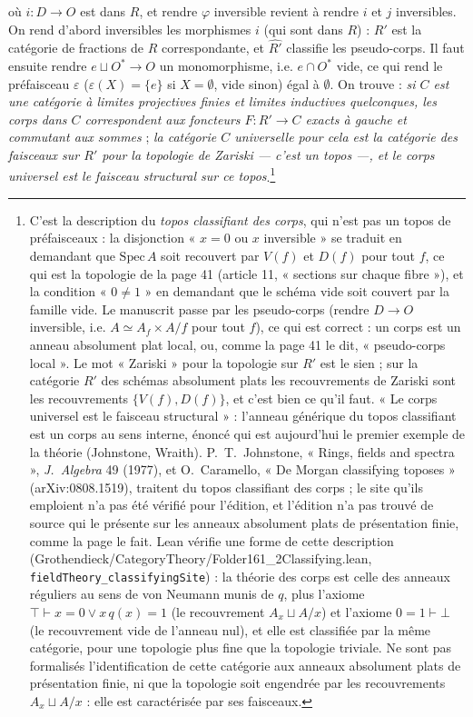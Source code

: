 \documentclass[11pt,a4paper]{article}
\begin{document}
où $i : D \to O$ est dans $R$, et rendre $\varphi$ inversible revient à
rendre $i$ et $j$ inversibles. On rend d'abord inversibles les morphismes
$i$ (qui sont dans $R$) : $R'$ est la catégorie de fractions de $R$
correspondante, et $\widehat{R'}$ classifie les pseudo-corps. Il faut
ensuite rendre $e \sqcup O^{*} \to O$ un monomorphisme, i.e. $e \cap O^{*}$
vide, ce qui rend le préfaisceau $\varepsilon$ ($\varepsilon(X) = \{e\}$ si
$X = \emptyset$, vide sinon) égal à $\emptyset$. On trouve : \emph{si $C$
est une catégorie à limites projectives finies et limites inductives
quelconques, les corps dans $C$ correspondent aux foncteurs $F : R' \to C$
exacts à gauche et commutant aux sommes} ; \emph{la catégorie $C$
universelle pour cela est la catégorie des faisceaux sur $R'$ pour la
topologie de Zariski — c'est un topos —, et le corps universel est le
faisceau structural sur ce topos}.\footnote{C'est la description
du \emph{topos classifiant des corps}, qui n'est pas un topos de
préfaisceaux : la disjonction « $x = 0$ ou $x$ inversible » se traduit en
demandant que $\mathrm{Spec}\,A$ soit recouvert par $V(f)$ et $D(f)$ pour
tout $f$, ce qui est la topologie de la page 41 (article 11, « sections
sur chaque fibre »), et la condition « $0 \neq 1$ » en demandant que le
schéma vide soit couvert par la famille vide. Le manuscrit passe par les
pseudo-corps (rendre $D \to O$ inversible, i.e. $A \simeq A_{f} \times
A/f$ pour tout $f$), ce qui est correct : un corps est un anneau
absolument plat local, ou, comme la page 41 le dit, « pseudo-corps
local ». Le mot « Zariski » pour la topologie sur $R'$ est le sien ; sur
la catégorie $R'$ des schémas absolument plats les recouvrements de
Zariski sont les recouvrements $\{V(f), D(f)\}$, et c'est bien ce qu'il
faut. « Le corps universel est le faisceau structural » : l'anneau
générique du topos classifiant est un corps au sens interne, énoncé qui
est aujourd'hui le premier exemple de la théorie (Johnstone, Wraith).
P.~T.~Johnstone, « Rings, fields and spectra », \emph{J.\ Algebra} 49
(1977), et O.~Caramello, « De Morgan classifying toposes »
(arXiv:0808.1519), traitent du topos classifiant des corps ; le site qu'ils
emploient n'a pas été vérifié pour l'édition, et l'édition n'a pas trouvé de
source qui le présente sur les anneaux absolument plats de présentation
finie, comme la page le fait. Lean vérifie une forme de cette description
(Grothendieck/CategoryTheory/Folder161\_2Classifying.lean, \texttt{fieldTheory\_classifyingSite}) :
la théorie des corps est celle des anneaux réguliers au sens de von Neumann munis
de $q$, plus l'axiome $\top \vdash x = 0 \vee x\,q(x) = 1$ (le recouvrement
$A_{x} \sqcup A/x$) et l'axiome $0 = 1 \vdash \bot$ (le recouvrement vide de
l'anneau nul), et elle est classifiée par la même catégorie, pour une topologie
plus fine que la topologie triviale. Ne sont pas formalisés l'identification de
cette catégorie aux anneaux absolument plats de présentation finie, ni que la
topologie soit engendrée par les recouvrements $A_{x} \sqcup A/x$ : elle est
caractérisée par ses faisceaux.}
\end{document}
